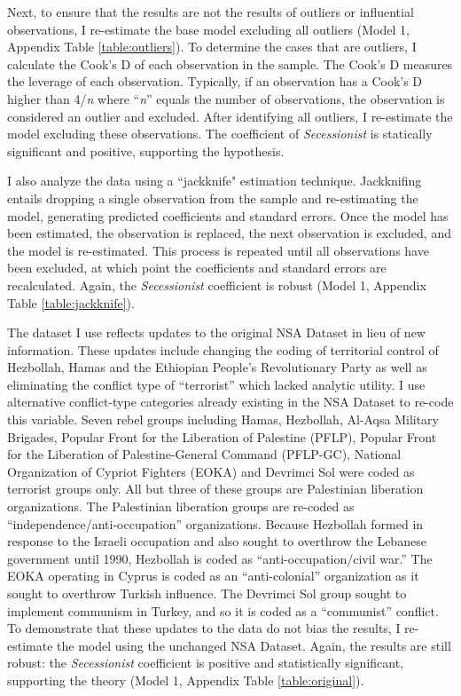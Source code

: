 \documentclass[12pt, letterpaper]{article}
\begin{document}
Next, to ensure that the results are not the results of outliers or influential observations, I re-estimate the base model excluding all outliers (Model 1, Appendix Table \ref{table:outliers}). To determine the cases that are outliers, I calculate the Cook's D of each observation in the sample. The Cook's D measures the leverage of each observation. Typically, if an observation has a Cook's D higher than 4/\textit{n} where ``\textit{n}'' equals the number of observations, the observation is considered an outlier and excluded. After identifying all outliers, I re-estimate the model excluding these observations. The coefficient of \textit{Secessionist} is statically significant and positive, supporting the hypothesis. 

I also analyze the data using a ``jackknife" estimation technique. Jackknifing entails dropping a single observation from the sample and re-estimating the model, generating predicted coefficients and standard errors. Once the model has been estimated, the observation is replaced, the next observation is excluded, and the model is re-estimated. This process is repeated until all observations have been excluded, at which point the coefficients and standard errors are recalculated. Again, the \textit{Secessionist} coefficient is robust (Model 1, Appendix Table \ref{table:jackknife}). 

The dataset I use reflects updates to the original NSA Dataset in lieu of new information. These updates include changing the coding of territorial control of Hezbollah, Hamas and the Ethiopian People's Revolutionary Party as well as eliminating the conflict type of ``terrorist'' which lacked analytic utility. I use alternative conflict-type categories already existing in the NSA Dataset to re-code this variable. Seven rebel groups including Hamas, Hezbollah, Al-Aqsa Military Brigades, Popular Front for the Liberation of Palestine (PFLP), Popular Front for the Liberation of Palestine-General Command (PFLP-GC), National Organization of Cypriot Fighters (EOKA) and Devrimci Sol were coded as terrorist groups only. All but three of these groups are Palestinian liberation organizations. The Palestinian liberation groups are re-coded as ``independence/anti-occupation'' organizations. Because Hezbollah formed in response to the Israeli occupation and also sought to overthrow the Lebanese government until 1990, Hezbollah is coded as ``anti-occupation/civil war.'' The EOKA operating in Cyprus is coded as an ``anti-colonial'' organization as it sought to overthrow Turkish influence. The Devrimci Sol group sought to implement communism in Turkey, and so it is coded as a ``communist'' conflict. To demonstrate that these updates to the data do not bias the results, I re-estimate the model using the unchanged NSA Dataset. Again, the results are still robust: the \textit{Secessionist} coefficient is positive and statistically significant, supporting the theory (Model 1, Appendix Table \ref{table:original}).
\end{document}

